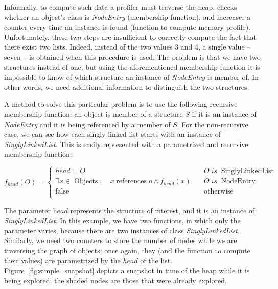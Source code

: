 Informally, to compute such data a profiler must traverse the heap, checks whether an object's class is \textit{NodeEntry} (membership function), and increases a counter every time an instance is found (function to compute memory profile).
Unfortunately, these two steps are insufficient to correctly compute the fact that there exist two lists.
Indeed,  instead of the two values 3 and 4, a single value -- seven -- is obtained when this procedure is used.
The problem is that we have two structures instead of one, but using the aforementioned membership function it is impossible to know of which structure an instance of \textit{NodeEntry} is member of.
In other words, we need additional information to distinguish the two structures.

A method to solve this particular problem is to use the following recursive membership function: an object is member of a structure $S$ if it is an instance of \textit{NodeEntry} and it is being referenced by a member of $S$.
For the non-recursive case, we can see how each singly linked list starts with an instance of \textit{SinglyLinkedList}.
This is easily represented with a parametrized and recursive membership function:

\begin{equation} \label{eq:simply-list}
	f_{head}\left(O\right) = 
	\begin{cases}
		head = O & \quad O \; is \; \operatorname{SinglyLinkedList} \\
		\exists {x \in \operatorname{Objects}}, \quad x \operatorname{references} o \wedge f_{head}\left(x\right) & \quad O \; is \; \operatorname{NodeEntry} \\
		\operatorname{false} & \quad \operatorname{otherwise} \\
	\end{cases}
\end{equation}

The parameter $\textit{head}$ represents the structure of interest, and it is an instance of \textit{SinglyLinkedList}.
In this example, we have two functions, in which only the parameter varies, because there are two instances of class \textit{SinglyLinkedList}.
Similarly, we need two counters to store the number of nodes while we are traversing the graph of objects; once again, they (and the function to compute their values) are parametrized by the $head$ of the list.
Figure~\ref{fig:simple_snapshot} depicts a snapshot in time of the heap while it is being explored;
the shaded nodes are those that were already explored.

